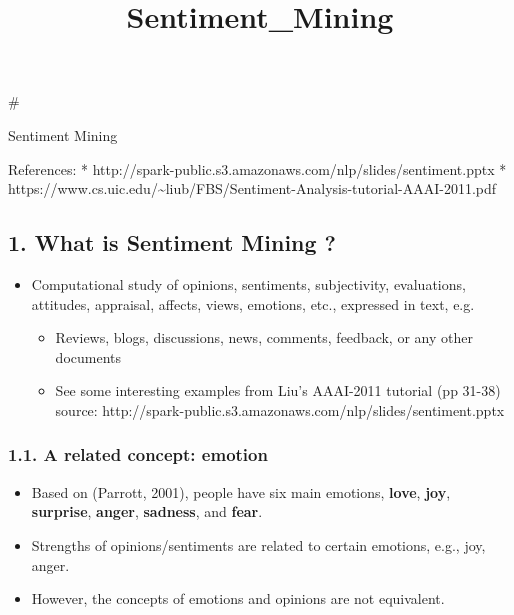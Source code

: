 \documentclass[11pt]{article}
\title{Sentiment\_Mining}
\providecommand{\tightlist}{%
      \setlength{\itemsep}{0pt}\setlength{\parskip}{0pt}}
\begin{document}
    
    
    \maketitle
    
    

    
    \#

Sentiment Mining

References: *
http://spark-public.s3.amazonaws.com/nlp/slides/sentiment.pptx *
https://www.cs.uic.edu/\textasciitilde{}liub/FBS/Sentiment-Analysis-tutorial-AAAI-2011.pdf

    \hypertarget{what-is-sentiment-mining}{%
\subsection{1. What is Sentiment Mining
?}\label{what-is-sentiment-mining}}

\begin{itemize}
\tightlist
\item
  Computational study of opinions, sentiments, subjectivity,
  evaluations, attitudes, appraisal, affects, views, emotions, etc.,
  expressed in text, e.g.

  \begin{itemize}
  \tightlist
  \item
    Reviews, blogs, discussions, news, comments, feedback, or any other
    documents
  \item
    See some interesting examples from Liu's AAAI-2011 tutorial (pp
    31-38) source:
    http://spark-public.s3.amazonaws.com/nlp/slides/sentiment.pptx
  \end{itemize}
\end{itemize}

    \hypertarget{a-related-concept-emotion}{%
\subsubsection{1.1. A related concept:
emotion}\label{a-related-concept-emotion}}

\begin{itemize}
\tightlist
\item
  Based on (Parrott, 2001), people have six main emotions,
  \textbf{love}, \textbf{joy}, \textbf{surprise}, \textbf{anger},
  \textbf{sadness}, and \textbf{fear}.\\
\item
  Strengths of opinions/sentiments are related to certain emotions,
  e.g., joy, anger.\\
\item
  However, the concepts of emotions and opinions are not equivalent.
\end{itemize}
\end{document}
